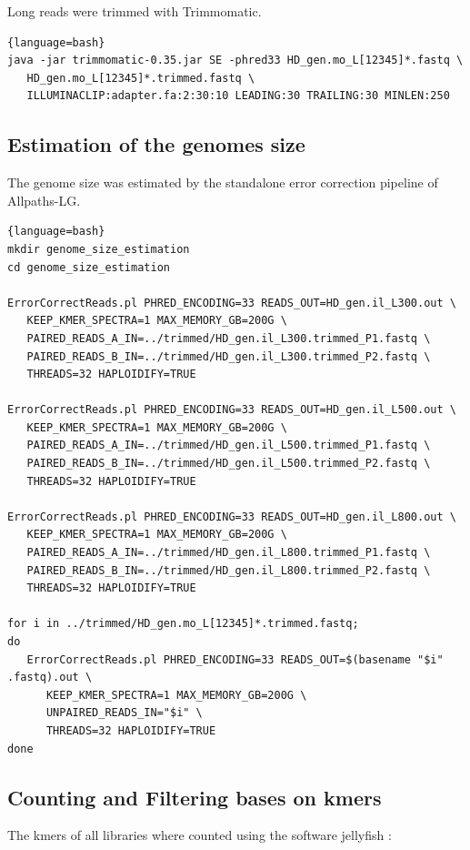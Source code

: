\documentclass[12pt,a4paper]{scrartcl}
\begin{document}
Long reads were trimmed with Trimmomatic.

\begin{lstlisting}{language=bash}
java -jar trimmomatic-0.35.jar SE -phred33 HD_gen.mo_L[12345]*.fastq \
   HD_gen.mo_L[12345]*.trimmed.fastq \
   ILLUMINACLIP:adapter.fa:2:30:10 LEADING:30 TRAILING:30 MINLEN:250
\end{lstlisting}

\subsection*{Estimation of the genomes size}

The genome size was estimated by the standalone error
correction pipeline of Allpaths-LG.

\begin{lstlisting}{language=bash}
mkdir genome_size_estimation
cd genome_size_estimation

ErrorCorrectReads.pl PHRED_ENCODING=33 READS_OUT=HD_gen.il_L300.out \
   KEEP_KMER_SPECTRA=1 MAX_MEMORY_GB=200G \
   PAIRED_READS_A_IN=../trimmed/HD_gen.il_L300.trimmed_P1.fastq \
   PAIRED_READS_B_IN=../trimmed/HD_gen.il_L300.trimmed_P2.fastq \
   THREADS=32 HAPLOIDIFY=TRUE

ErrorCorrectReads.pl PHRED_ENCODING=33 READS_OUT=HD_gen.il_L500.out \
   KEEP_KMER_SPECTRA=1 MAX_MEMORY_GB=200G \
   PAIRED_READS_A_IN=../trimmed/HD_gen.il_L500.trimmed_P1.fastq \
   PAIRED_READS_B_IN=../trimmed/HD_gen.il_L500.trimmed_P2.fastq \
   THREADS=32 HAPLOIDIFY=TRUE

ErrorCorrectReads.pl PHRED_ENCODING=33 READS_OUT=HD_gen.il_L800.out \
   KEEP_KMER_SPECTRA=1 MAX_MEMORY_GB=200G \
   PAIRED_READS_A_IN=../trimmed/HD_gen.il_L800.trimmed_P1.fastq \
   PAIRED_READS_B_IN=../trimmed/HD_gen.il_L800.trimmed_P2.fastq \
   THREADS=32 HAPLOIDIFY=TRUE

for i in ../trimmed/HD_gen.mo_L[12345]*.trimmed.fastq;
do
   ErrorCorrectReads.pl PHRED_ENCODING=33 READS_OUT=$(basename "$i" .fastq).out \
      KEEP_KMER_SPECTRA=1 MAX_MEMORY_GB=200G \
      UNPAIRED_READS_IN="$i" \
      THREADS=32 HAPLOIDIFY=TRUE
done
\end{lstlisting}

\subsection*{Counting and Filtering bases on kmers}

The kmers of all libraries where counted using the software jellyfish
\parencite{Marcais2011}:
\end{document}
